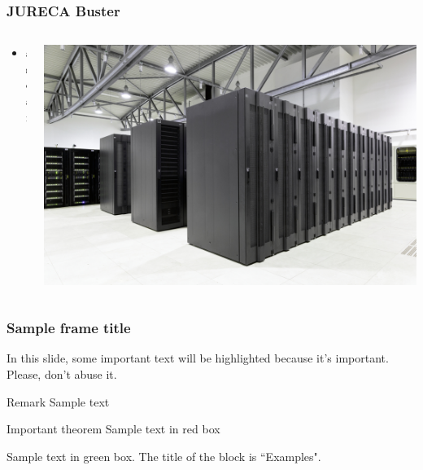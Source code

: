 \documentclass{beamer}
\begin{document}
\begin{frame}
  \frametitle{JURECA Buster}
  \begin{columns}[T]
    \begin{column}{.5\textwidth}
      \begin{itemize}
        \item asdaf
      \end{itemize}
    \end{column}
    \begin{column}{.5\textwidth}
      \includegraphics[width=\textwidth]{./images/jureca-buster.jpeg}
    \end{column}
  \end{columns}
\end{frame}

\begin{frame}
  \frametitle{Sample frame title}

  In this slide, some important text will be
  \alert{highlighted} because it's important.
  Please, don't abuse it.

  \begin{block}{Remark}
    Sample text
  \end{block}

  \begin{alertblock}{Important theorem}
    Sample text in red box
  \end{alertblock}

  \begin{examples}
    Sample text in green box. The title of the block is ``Examples".
  \end{examples}
\end{frame}
\end{document}
